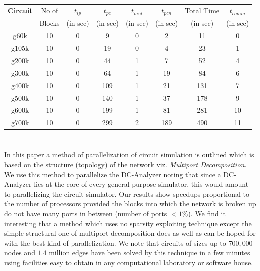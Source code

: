\documentclass[10pt,psfig,letterpaper,twocolumn]{article}
\begin{document}
\begin{table}[ht!]
\begin{center}
\begin{tabular}{|c|c|c|c|c|c|c|c|} 
\hline
{\bf Circuit} & No of & $t_{ip}$ & $t_{pc}$ & $t_{mul}$ &  $t_{pcn}$ & Total Time & $t_{comm}$ \\ 
              & Blocks& (in sec)& (in sec)  & (in sec)  &  (in sec)  & (in sec)   & (in sec)   \\ \hline 
g60k& 10& 0 & 9  &0 &2& 11&   0 \\ \hline 
g105k&10& 0 &19  &0 &4& 23&   1 \\ \hline 
g200k&10& 0 &44  &1 &7& 52&   4 \\ \hline 
g300k&10& 0 &64  &1 &19&84&   6 \\ \hline 
g400k&10& 0 &109 &1 &21&131& 7 \\ \hline 
g500k&10& 0 &140 &1 &37&178& 9 \\ \hline 
g600k&10& 0 &199 &1 &81&281& 10\\ \hline 
g700k&10& 0 &299 &2 &189&490&11\\ \hline 
\end{tabular}
\end{center}
\end{table}

\section*{}
In this paper a method of parallelization of circuit simulation
is outlined which is based on the structure (topology) of the network
viz. {\it Multiport Decomposition}.
We use this method to parallelize the DC-Analyzer noting that 
since a DC-Analyzer lies at the core of every general purpose simulator, this would amount
to parallelizing the circuit simulator.
Our results show speedups proportional to the number of processors
provided the blocks into which the network is broken up do
not have many ports in between (number of ports $< 1\%$).
We find it interesting that a method which uses no 
sparsity exploiting technique except the simple structural one 
of multiport decomposition does as well as can be hoped for with the best 
kind of parallelization. We note that circuits of sizes up to $700,000$ nodes
and $1.4$ million edges have been solved by this technique in a few minutes using
facilities easy to obtain in any computational laboratory or 
software house.
\pagebreak[4]
\vspace*{5.52in}

\end{document}
